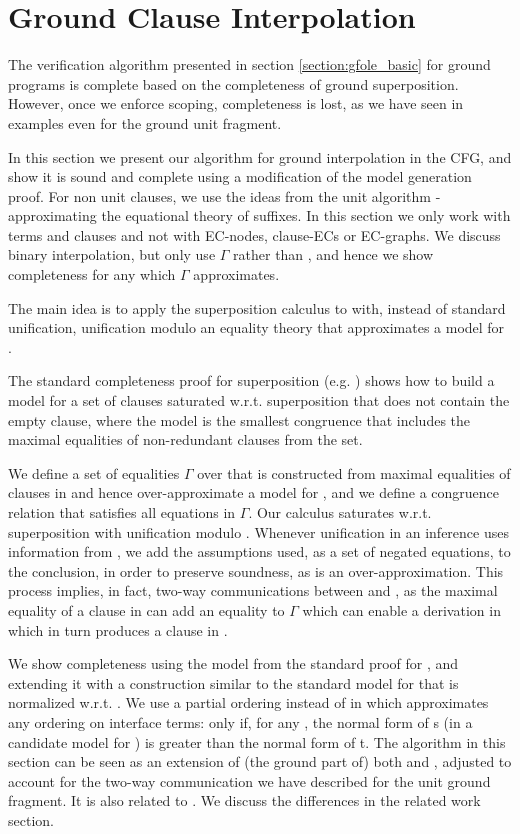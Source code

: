 \newpage
\section{Ground Clause Interpolation}\label{section:scoping:gfole}
The verification algorithm presented in section \ref{section:gfole_basic} for ground programs is complete based on the completeness of ground superposition. However, once we enforce scoping, completeness is lost, as we have seen in examples even for the ground unit fragment.

In this section we present our algorithm for ground interpolation in the CFG, and show it is sound and complete using a modification of the model generation proof.
For non unit clauses, we use the ideas from the unit algorithm - approximating the equational theory of suffixes.
In this section we only work with terms and clauses and not with EC-nodes, clause-ECs or EC-graphs.
We discuss binary interpolation, but only use $\Gamma$ rather than , 
and hence we show completeness for any  which $\Gamma$ approximates.

The main idea is to apply the superposition calculus to  with, instead of standard unification,
 unification modulo an equality theory that approximates a model for .

The standard completeness proof for superposition (e.g. \cite{BachmairGanzingerSuperposition}) shows how to build a model for a set of clauses saturated w.r.t. superposition that does not contain the empty clause, where the model is the smallest congruence that includes the maximal equalities of non-redundant clauses from the set. 

We define a set of equalities $\Gamma$ over \langI{} that is constructed from maximal equalities of clauses in  and hence over-approximate a model for , and we define a congruence relation \eqg{} that satisfies all equations in $\Gamma$.
Our calculus saturates  w.r.t. superposition with unification modulo \eqg{}.
Whenever unification in an inference uses information from \eqg{}, we add the assumptions used, as a set of negated equations, to the conclusion, in order to preserve soundness, as \m{=_{\Gamma}} is an over-approximation.
This process implies, in fact, two-way communications between  and , as the maximal equality of a clause in  can add an equality to $\Gamma$ which can enable a derivation in  which in turn produces a clause in .

We show completeness using the model from the standard proof for , and extending it with a construction similar to the standard model for  that is normalized w.r.t. .
We use a partial ordering  instead of \m{\succ} in  which approximates any ordering on interface terms: 
 only if, for any , the normal form of s (in a candidate model for ) is greater than the normal form of t.
The algorithm in this section can be seen as an extension of (the ground part of) both \cite{McMillan08} and \cite{BaumgartnerWaldmann13}, 
adjusted to account for the two-way communication we have described for the unit ground fragment. It is also related to \cite{KovacsVoronkov09}.
We discuss the differences in the related work section.

